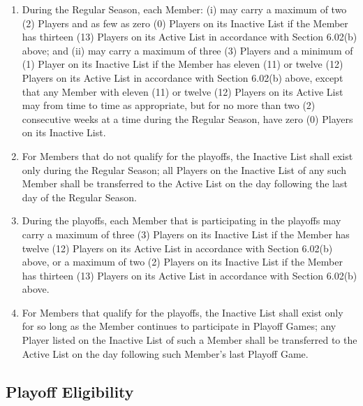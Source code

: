 \documentclass[]{book}
\providecommand{\tightlist}{%
  \setlength{\itemsep}{0pt}\setlength{\parskip}{0pt}}
\theoremstyle{definition}
\theoremstyle{definition}
\theoremstyle{definition}
\theoremstyle{remark}
\begin{document}
\begin{enumerate}
\def\labelenumi{(\alph{enumi})}
\tightlist
\item
  During the Regular Season, each Member: (i) may carry a maximum of two
  (2) Players and as few as zero (0) Players on its Inactive List if the
  Member has thirteen (13) Players on its Active List in accordance with
  Section 6.02(b) above; and (ii) may carry a maximum of three (3)
  Players and a minimum of (1) Player on its Inactive List if the Member
  has eleven (11) or twelve (12) Players on its Active List in
  accordance with Section 6.02(b) above, except that any Member with
  eleven (11) or twelve (12) Players on its Active List may from time to
  time as appropriate, but for no more than two (2) consecutive weeks at
  a time during the Regular Season, have zero (0) Players on its
  Inactive List.
\item
  For Members that do not qualify for the playoffs, the Inactive List
  shall exist only during the Regular Season; all Players on the
  Inactive List of any such Member shall be transferred to the Active
  List on the day following the last day of the Regular Season.
\item
  During the playoffs, each Member that is participating in the playoffs
  may carry a maximum of three (3) Players on its Inactive List if the
  Member has twelve (12) Players on its Active List in accordance with
  Section 6.02(b) above, or a maximum of two (2) Players on its Inactive
  List if the Member has thirteen (13) Players on its Active List in
  accordance with Section 6.02(b) above.
\item
  For Members that qualify for the playoffs, the Inactive List shall
  exist only for so long as the Member continues to participate in
  Playoff Games; any Player listed on the Inactive List of such a Member
  shall be transferred to the Active List on the day following such
  Member's last Playoff Game.
\end{enumerate}

\subsection{Playoff Eligibility}\label{playoff-eligibility}
\end{document}
